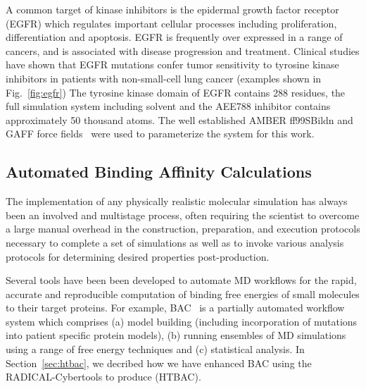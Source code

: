 \documentclass{bmcart}
\def\texttt{[image: ]}
\begin{document}


A common target of kinase inhibitors is the epidermal growth factor receptor
(EGFR) which regulates important cellular processes including proliferation,
differentiation and apoptosis. EGFR is frequently over expressed in a range of
cancers, and is associated with disease progression and treatment. Clinical
studies have shown that EGFR mutations confer tumor sensitivity to tyrosine
kinase inhibitors in patients with non-small-cell lung cancer (examples shown
in Fig.~\ref{fig:egfr}) The tyrosine kinase domain of EGFR contains 288
residues, the full simulation system including solvent and the AEE788
inhibitor contains approximately 50 thousand atoms. The well established AMBER
ff99SBildn and GAFF force fields~\cite{Maier2015, Wang2004} were used to
parameterize the system for this work.

\subsection{Automated Binding Affinity Calculations}

The implementation of any physically realistic molecular simulation has
always been an involved and multistage process, often requiring the scientist
to overcome a large manual overhead in the construction, preparation, and
execution protocols necessary to complete a set of simulations as well as to
invoke various analysis protocols for determining desired properties
post-production.

Several tools have been been developed to automate MD workflows for the
rapid, accurate and reproducible computation of binding free energies of
small molecules to their target proteins. For example, BAC~\cite{Sadiq2008}
is a partially automated workflow system which comprises (a) model building
(including incorporation of mutations into patient specific protein models),
(b) running ensembles of MD simulations using a range of free energy
techniques and (c) statistical analysis. In Section~\ref{sec:htbac}, we decribed
how we have enhanced BAC using the RADICAL-Cybertools to produce (HTBAC).
\end{document}
